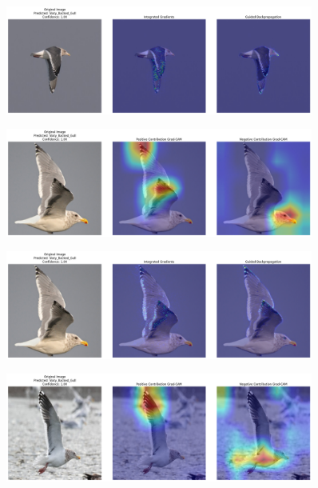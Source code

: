 \documentclass[a4paper,12pt]{report}
\begin{document}
\begin{figure}[H]
    \centering
    \includegraphics[width=0.9\textwidth]{images/appendix/vggcombined/download2.png}
\end{figure}


\begin{figure}[H]
    \centering
    \includegraphics[width=0.9\textwidth]{images/appendix/vggcombined/download (2).png}
\end{figure}

\begin{figure}[H]
    \centering
    \includegraphics[width=0.9\textwidth]{images/appendix/vggcombined/download1.png}
\end{figure}


\begin{figure}[H]
    \centering
    \includegraphics[width=0.9\textwidth]{images/appendix/vggcombined/download (11).png}
\end{figure}
\end{document}
